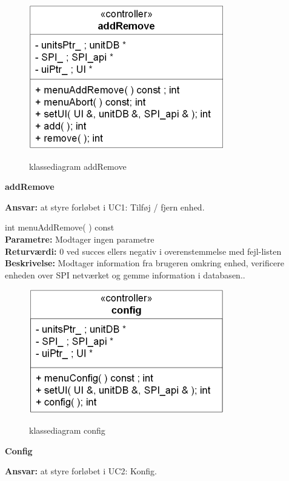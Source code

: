 \newpage

\begin{figure}[htbp] \centering
{\includegraphics[scale=1.5]{filer/design/Klassediagrammer/sw_addRemove}}
\caption{klassediagram addRemove}
\label{fig:addRemove klassediagram}
\end{figure} 

{\centering
\textbf{addRemove}\par
}
\textbf{Ansvar:} at styre forløbet i UC1: Tilføj / fjern enhed. \

int menuAddRemove( ) const \\
\textbf{Parametre:} Modtager ingen parametre \\
\textbf{Returværdi:} 0 ved succes ellers negativ i overenstemmelse med fejl-listen \\
\textbf{Beskrivelse:} Modtager information fra brugeren omkring enhed, verificere enheden over SPI netværket og gemme information i databasen..\\

\begin{figure}[htbp] \centering
{\includegraphics[scale=1.5]{filer/design/Klassediagrammer/sw_config}}
\caption{klassediagram config}
\label{fig:config klassediagram}
\end{figure} 

{\centering
\textbf{Config}\par
}
\textbf{Ansvar:} at styre forløbet i UC2: Konfig. \

